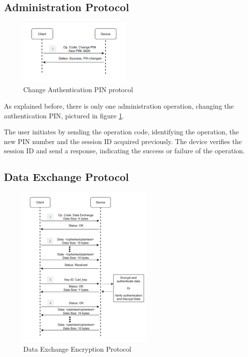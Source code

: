 \subsection{Administration Protocol} \label{chap:solution:protocol:admin}
\begin{figure}[h]
	\centering
	\includegraphics[width=0.5\textwidth]{./Images/change-PIN.png}
	\caption{Change Authentication PIN protocol}
	\label{fig:protocol:change-PIN}
\end{figure}

As explained before, there is only one administration operation, changing the authentication \ac{PIN}, pictured in figure \ref{fig:protocol:change-PIN}.

The user initiates by sending the operation code, identifying the operation, the new PIN number and the session ID acquired previously. The device verifies the session ID and send a response, indicating the success or failure of the operation.

\subsection{Data Exchange Protocol} \label{chap:solution:protocol:data}

\begin{figure}[h]
	\centering
	\includegraphics[width=0.6\textwidth]{./Images/data-exchange.png}
	\caption{Data Exchange Encryption Protocol}
	\label{fig:protocol:data-exchange}
\end{figure}


